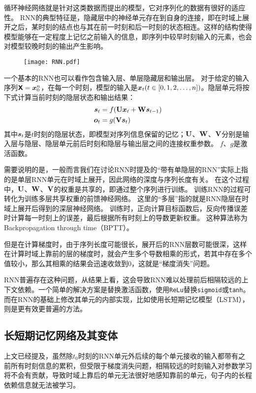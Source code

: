 循环神经网络就是针对这类数据而提出的模型，它对序列化的数据有很好的适应性。
RNN的典型特征是，隐藏层中的神经单元存在到自身的连接，即在时域上展开之后，某时刻的结点也与其在前一时刻和后一时刻的状态相连。这样的结构使得模型能够在一定程度上记忆之前输入的信息，即序列中较早时刻输入的元素，也会对模型较晚时刻的输出产生影响。

\begin{figure}[H]
    \centering
    \texttt{[image: RNN.pdf]}
    \label{fig:RNN}
\end{figure}

一个基本的RNN也可以看作包含输入层、单层隐藏层和输出层。
对于给定的输入序列$\boldsymbol{\mathsf{X}}=\boldsymbol{x}^n_0$，在每一个时刻，模型的输入是$\boldsymbol{x}_t(t \in [0, 1, 2, \dots, n])$。隐层单元将按下式计算当前时刻的隐层状态和输出结果：
\begin{align}
    \boldsymbol{s}_t &= f(\boldsymbol{\mathbf{U}}\boldsymbol{x}_t + \boldsymbol{\mathbf{W}}\boldsymbol{s}_{t-1})\\
    \boldsymbol{o}_t &= g(\boldsymbol{\mathbf{V}}\boldsymbol{s}_t)
\end{align}
其中$\boldsymbol{s}_t$是$t$时刻的隐层状态，即模型对序列信息保留的记忆；$\boldsymbol{\mathbf{U}}$、$\boldsymbol{\mathbf{W}}$、$\boldsymbol{\mathbf{V}}$分别是输入层与隐层、隐层单元前后时刻和隐层与输出层之间的连接权重参数。
$f$、$g$是激活函数。

需要说明的是，一般而言我们在讨论RNN时提及的“带有单隐层的RNN”实际上指的是单层RNN单元在时域上展开，因此网络的深度与序列长度有关。
在这个过程中，$\boldsymbol{\mathbf{U}}$、$\boldsymbol{\mathbf{W}}$、$\boldsymbol{\mathbf{V}}$的权重是共享的，即通过整个序列进行训练。
训练RNN的过程可转化为训练多层共享权重的前馈神经网络。
这里的“多层”指的就是RNN隐层在时域上展开后得到的深层神经网络。
训练时，正向计算目标函数后，反向传播误差时计算每一时刻上的误差，最后根据所有时刻上的导数更新权重。
这种算法称为Backpropagation through time（BPTT）。

但是在计算梯度时，由于序列长度可能很长，展开后的RNN层数可能很深，这样在计算时域上靠前的层的梯度时，就会产生多个导数相乘的形式，若其中存在多个值较小，那么其相乘的结果会迅速收敛到0，这就是“梯度消失”问题。

RNN普遍存在这种问题，从结果上看，这会导致RNN难以处理前后相隔较远的上下文依赖。一个简单的解决方案是替换激活函数，使用\verb|ReLu|替换\verb|sigmoid|或\verb|tanh|。而在RNN的基础上修改其单元的内部实现，比如使用长短期记忆模型（LSTM），则是更有效更普遍的方法。

\subsection{长短期记忆网络及其变体}
上文已经提及，虽然除$t_0$时刻的RNN单元外后续的每个单元接收的输入都带有之前所有时刻信息的累积，但受限于梯度消失问题，相隔较远的时刻输入对参数学习将不会有贡献，导致时域上靠后的单元无法很好地感知靠前的单元，句子内的长程依赖信息就无法被学习。

